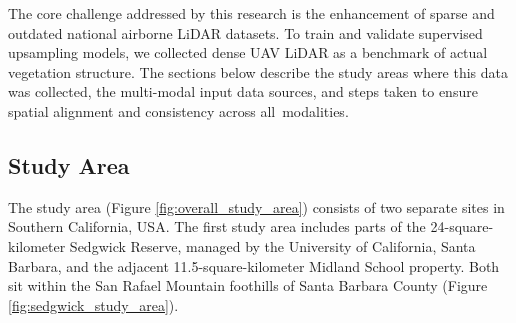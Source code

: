 \documentclass[remotesensing,article,accept,pdftex,moreauthors]{Definitions/mdpi}
\begin{document}

The core challenge addressed by this research is the enhancement of sparse and outdated national airborne LiDAR datasets. To train and validate supervised upsampling models, we collected dense UAV LiDAR as a benchmark of actual vegetation structure. The sections below describe the study areas where this data was collected, the multi-modal input data sources, and steps taken to ensure spatial alignment and consistency across \mbox{all modalities}.


\subsection{Study Area}


The study area (Figure \ref{fig:overall_study_area}) consists of two separate sites in Southern California, USA. The first study area includes parts of the 24-square-kilometer Sedgwick Reserve, managed by the University of California, Santa Barbara, and the adjacent 11.5-square-kilometer Midland School property. Both sit within the San Rafael Mountain foothills of Santa Barbara County (Figure \ref{fig:sedgwick_study_area}). 
\end{document}
